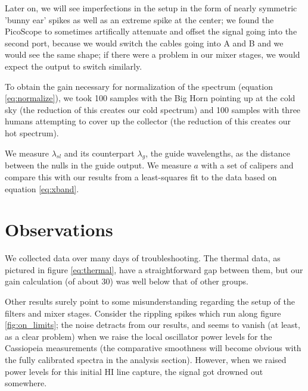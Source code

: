 \documentclass[12pt]{article}
\begin{document}
Later on, we will see imperfections in the setup in the form of nearly symmetric 'bunny ear' spikes as well as an extreme spike at the center; we found the PicoScope to sometimes artifically attenuate and offset the signal going into the second port, because we would switch the cables going into A and B and we would see the same shape; if there were a problem in our mixer stages, we would expect the output to switch similarly. 

To obtain the gain necessary for normalization of the spectrum (equation \ref{eq:normalize}), we took 100 samples with the Big Horn pointing up at the cold sky (the reduction of this creates our cold spectrum) and 100 samples with three humans attempting to cover up the collector (the reduction of this creates our hot spectrum).

We measure $\lambda_{sl}$ and its counterpart $\lambda_g$, the guide wavelengths, as the distance between the nulls in the guide output. We measure $a$ with a set of calipers and compare this with our results from a least-squares fit to the data based on equation \ref{eq:xband}.

\section{Observations}



\quad \quad We collected data over many days of troubleshooting. The thermal data, as pictured in figure \ref{eq:thermal}, have a straightforward gap between them, but our gain calculation (of about 30) was well below that of other groups.

Other results surely point to some misunderstanding regarding the setup of the filters and mixer stages. Consider the rippling spikes which run along figure \ref{fig:on_limits}; the noise detracts from our results, and seems to vanish (at least, as a clear problem) when we raise the local oscillator power levels for the Cassiopeia measurements (the comparative smoothness will become obvious with the fully calibrated spectra in the analysis section). However, when we raised power levels for this initial HI line capture, the signal got drowned out somewhere.
\end{document}
